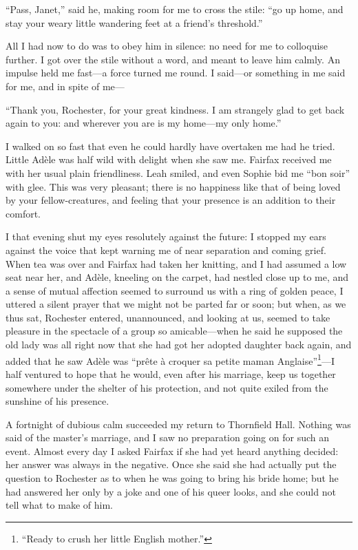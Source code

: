 \enquote{Pass, Janet,} said he, making room for me to cross the stile:
\enquote{go up home, and stay your weary little wandering feet at a
	friend's threshold.}

All I had now to do was to obey him in silence: no need for me to
colloquise further. I got over the stile without a word, and meant to
leave him calmly. An impulse held me fast---a force turned me round. I
said---or something in me said for me, and in spite of me---

\enquote{Thank you, \Mr{} Rochester, for your great kindness. I am
	strangely glad to get back again to you: and wherever you are is my
	home---my only home.}

I walked on so fast that even he could hardly have overtaken me had he
tried. Little Adèle was half wild with delight when she saw me. \Mrs{}
Fairfax received me with her usual plain friendliness. Leah smiled, and
even Sophie bid me \enquote{bon soir} with glee. This was very
pleasant; there is no happiness like that of being loved by your
fellow-creatures, and feeling that your presence is an addition to their
comfort.

I that evening shut my eyes resolutely against the future: I stopped my
ears against the voice that kept warning me of near separation and
coming grief. When tea was over and \Mrs{} Fairfax had taken her
knitting, and I had assumed a low seat near her, and Adèle, kneeling on
the carpet, had nestled close up to me, and a sense of mutual affection
seemed to surround us with a ring of golden peace, I uttered a silent
prayer that we might not be parted far or soon; but when, as we thus
sat, \Mr{} Rochester entered, unannounced, and looking at us, seemed to
take pleasure in the spectacle of a group so amicable---when he said he
supposed the old lady was all right now that she had got her adopted
daughter back again, and added that he saw Adèle was \foreignquote{french}{prête à
	croquer sa petite maman Anglaise}\footnote{\enquote{Ready to crush her little English mother.}}---I half ventured to hope that he
would, even after his marriage, keep us together somewhere under the
shelter of his protection, and not quite exiled from the sunshine of his
presence.

A fortnight of dubious calm succeeded my return to Thornfield Hall.
Nothing was said of the master's marriage, and I saw no preparation
going on for such an event. Almost every day I asked \Mrs{} Fairfax if
she had yet heard anything decided: her answer was always in the
negative. Once she said she had actually put the question to \Mr{}
Rochester as to when he was going to bring his bride home; but he had
answered her only by a joke and one of his queer looks, and she could
not tell what to make of him.

